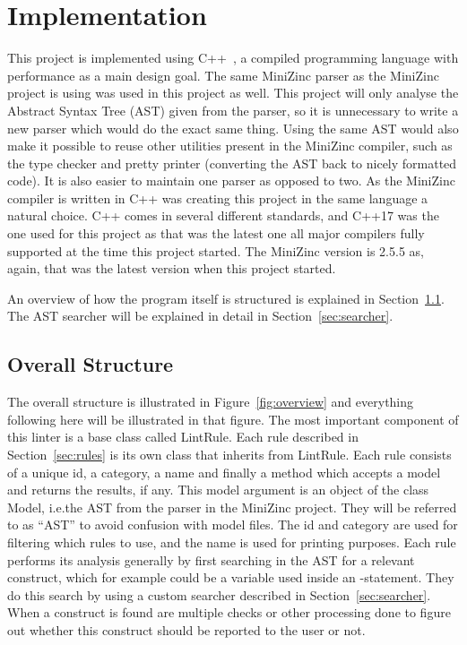 \documentclass[a4paper,12pt]{article}
\newcommand{\mi}[1]{\mbox{\mzninline{#1}}}
\newcommand{\cpp}[1]{\mbox{\mznfont #1}}
\begin{document}


\section{Implementation}\label{sec:impl}
This project is implemented using C++~\cite{cpp}, a compiled programming language with
performance as a main design goal. The same MiniZinc parser as the MiniZinc project is
using was used in this project as well. This project will only analyse
the Abstract Syntax Tree (AST) given from the parser, so it is unnecessary to write a new
parser which would do the exact same thing. Using the same AST would also make it possible
to reuse other utilities present in the MiniZinc compiler, such as the type checker and
pretty printer (converting the AST back to nicely formatted code). It is also easier to
maintain one parser as opposed to two. As the MiniZinc
compiler is written in C++ was creating this project in the same language a natural
choice. C++ comes in several different standards, and C++17 was the one used for this
project as that was the latest one all major compilers fully supported at the time this
project started. The MiniZinc version is 2.5.5 as, again, that was the latest version when
this project started.

An overview of how the program itself is structured is explained in
Section~\ref{sec:impl:structure}. The AST searcher will be explained in detail in
Section~\ref{sec:searcher}.

\subsection{Overall Structure}\label{sec:impl:structure}


The overall structure is illustrated in Figure~\ref{fig:overview} and everything following
here will be illustrated in that figure.
The most important component of this linter is a base class called \cpp{LintRule}. Each
rule described in Section~\ref{sec:rules} is its own class that inherits from
\cpp{LintRule}. Each rule consists of a unique id, a category, %
a name and finally a method which accepts a model and returns the results, if any. This
model argument is an object of the class \cpp{Model}, i.e.\@ the AST from the parser in
the MiniZinc project. They will be referred to as ``AST'' to avoid confusion with model
files. The id and category are used for filtering which rules to use, and the name is used
for printing purposes. Each rule performs its analysis generally by first searching in the
AST for a relevant construct, which for example could be a variable used inside an
\mi{if}-statement. They do this search by using a custom searcher described in
Section~\ref{sec:searcher}. When a construct is found are multiple checks or other
processing done to figure out whether this construct should be reported to the user or not.
\end{document}

